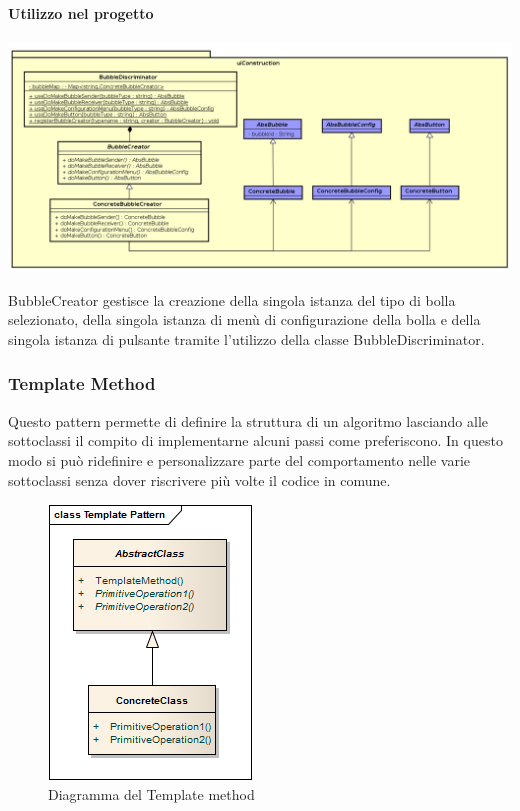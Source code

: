 \paragraph{Utilizzo nel progetto}

\begin{center}
	\includegraphics[scale=0.22]{img/esempio1.png}
\end{center}

BubbleCreator gestisce la creazione della singola istanza del tipo di bolla selezionato, della singola istanza di menù di configurazione della bolla e della singola istanza di pulsante tramite l'utilizzo della classe BubbleDiscriminator.


\subsubsection{Template Method}
Questo pattern permette di definire la struttura di un algoritmo
lasciando alle sottoclassi il compito di implementarne alcuni passi
come preferiscono. In questo modo si può ridefinire e personalizzare
parte del comportamento nelle varie sottoclassi senza dover riscrivere
più volte il codice in comune. 

	\FloatBarrier
	\begin{figure}[ht]
		\centering
		\includegraphics[scale=0.45]{img/template-pattern.png}
		\caption{Diagramma del Template method}
	\end{figure}



